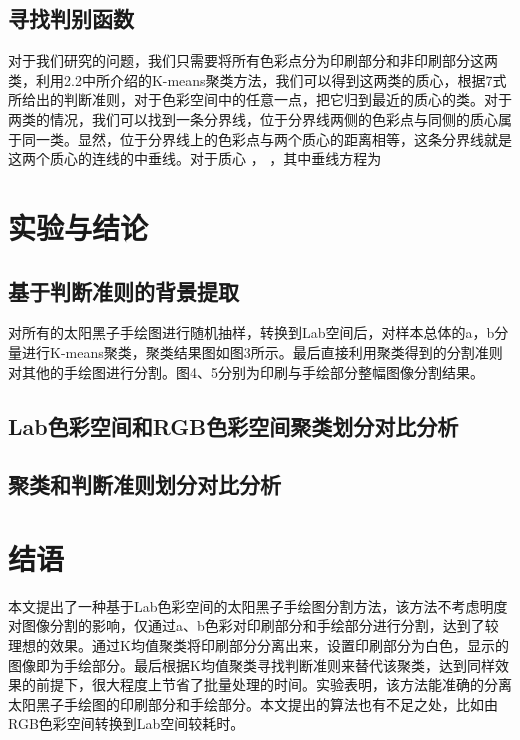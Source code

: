 \documentclass[UTF8,a4paper,twoside]{ctexart}
\begin{document}
\subsection{寻找判别函数}
对于我们研究的问题，我们只需要将所有色彩点分为印刷部分和非印刷部分这两类，利用2.2中所介绍的K-means聚类方法，我们可以得到这两类的质心，根据7式所给出的判断准则，对于色彩空间中的任意一点，把它归到最近的质心的类。对于两类的情况，我们可以找到一条分界线，位于分界线两侧的色彩点与同侧的质心属于同一类。显然，位于分界线上的色彩点与两个质心的距离相等，这条分界线就是这两个质心的连线的中垂线。对于质心 ， ，其中垂线方程为 

\section{实验与结论}
\subsection{基于判断准则的背景提取}
对所有的太阳黑子手绘图进行随机抽样，转换到Lab空间后，对样本总体的a，b分量进行K-means聚类，聚类结果图如图3所示。最后直接利用聚类得到的分割准则对其他的手绘图进行分割。图4、5分别为印刷与手绘部分整幅图像分割结果。

\subsection{Lab色彩空间和RGB色彩空间聚类划分对比分析}

\subsection{聚类和判断准则划分对比分析}

\section{结语}

本文提出了一种基于Lab色彩空间的太阳黑子手绘图分割方法，该方法不考虑明度对图像分割的影响，仅通过a、b色彩对印刷部分和手绘部分进行分割，达到了较理想的效果。通过K均值聚类将印刷部分分离出来，设置印刷部分为白色，显示的图像即为手绘部分。最后根据K均值聚类寻找判断准则来替代该聚类，达到同样效果的前提下，很大程度上节省了批量处理的时间。实验表明，该方法能准确的分离太阳黑子手绘图的印刷部分和手绘部分。本文提出的算法也有不足之处，比如由RGB色彩空间转换到Lab空间较耗时。


%

%
\end{document}
